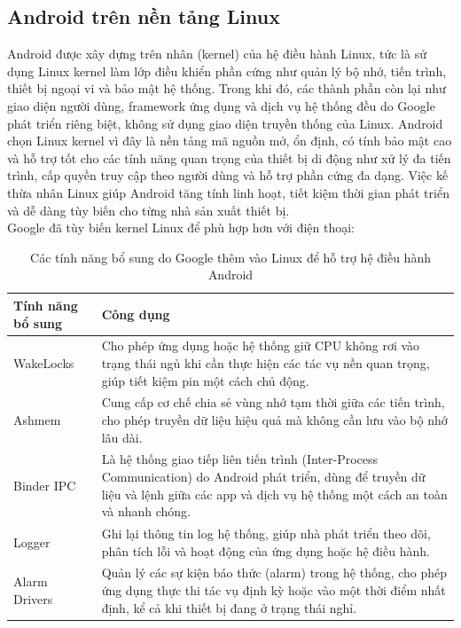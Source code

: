 \subsection{Android trên nền tảng Linux}
\renewcommand{\labelitemi}{--}    
\begin{flushleft}
    \hspace*{0.8cm}Android được xây dựng trên nhân (kernel) của hệ điều hành Linux, tức là sử dụng Linux kernel làm lớp điều khiển phần cứng như quản lý bộ nhớ, tiến trình, thiết bị ngoại vi và bảo mật hệ thống. Trong khi đó, các thành phần còn lại như giao diện người dùng, framework ứng dụng và dịch vụ hệ thống đều do Google phát triển riêng biệt, không sử dụng giao diện truyền thống của Linux. Android chọn Linux kernel vì đây là nền tảng mã nguồn mở, ổn định, có tính bảo mật cao và hỗ trợ tốt cho các tính năng quan trọng của thiết bị di động như xử lý đa tiến trình, cấp quyền truy cập theo người dùng và hỗ trợ phần cứng đa dạng. Việc kế thừa nhân Linux giúp Android tăng tính linh hoạt, tiết kiệm thời gian phát triển và dễ dàng tùy biến cho từng nhà sản xuất thiết bị.\\
    \hspace*{0.8cm}Google đã tùy biến kernel Linux để phù hợp hơn với điện thoại:
    \begin{table}[H]
        \centering
        \renewcommand{\arraystretch}{1.5}
        \begin{tabular}{|p{3.5cm}|p{12cm}|}
            \hline
            \textbf{Tính năng bổ sung} & \textbf{Công dụng} \\
            \hline
            WakeLocks & Cho phép ứng dụng hoặc hệ thống giữ CPU không rơi vào trạng thái ngủ khi cần thực hiện các tác vụ nền quan trọng, giúp tiết kiệm pin một cách chủ động. \\
            \hline
            Ashmem  & Cung cấp cơ chế chia sẻ vùng nhớ tạm thời giữa các tiến trình, cho phép truyền dữ liệu hiệu quả mà không cần lưu vào bộ nhớ lâu dài. \\
            \hline
            Binder IPC & Là hệ thống giao tiếp liên tiến trình (Inter-Process Communication) do Android phát triển, dùng để truyền dữ liệu và lệnh giữa các app và dịch vụ hệ thống một cách an toàn và nhanh chóng. \\
            \hline
            Logger & Ghi lại thông tin log hệ thống, giúp nhà phát triển theo dõi, phân tích lỗi và hoạt động của ứng dụng hoặc hệ điều hành. \\
            \hline
            Alarm Drivers & Quản lý các sự kiện báo thức (alarm) trong hệ thống, cho phép ứng dụng thực thi tác vụ định kỳ hoặc vào một thời điểm nhất định, kể cả khi thiết bị đang ở trạng thái nghỉ. \\
            \hline
        \end{tabular}
        \caption{Các tính năng bổ sung do Google thêm vào Linux để hỗ trợ hệ điều hành Android}
        \label{table:android-linux-features}
        \end{table}          
\end{flushleft}

